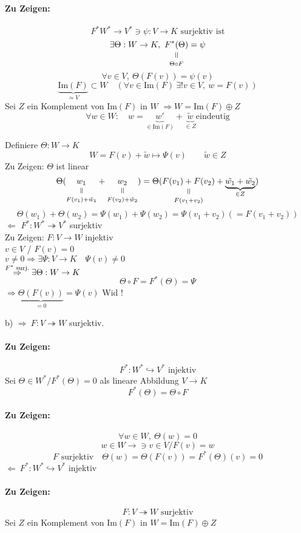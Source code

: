 \documentclass[titlepage,12pt,a4paper,ngerman]{report}
\newcommand{\verteq}{\rotatebox{90}{$\,=$}}
\newcommand{\equalto}[2]{\underset{\scriptstyle\overset{\mkern4mu\verteq}{#2}}{#1}}
\newcommand{\tx}[1]{\textrm{#1}}
\newcommand{\ub}[1]{\underbrace{#1}}
\begin{document}
\paragraph{Zu Zeigen:} $$F^* W^* \to V^* \ni \psi: V \to K \tx{ surjektiv ist}$$
$$\exists \Theta: W \to K,\ \equalto{F^* (\Theta)}{\Theta \circ F} = \psi$$
$$\forall v \in V,\ \Theta(F(v)) = \psi(v)$$
$$\underbrace{\tx{Im}(F)}_{\simeq V} \subset W \quad (\forall v \in \tx{Im}(F)\ \exists ! v \in V,\ w = F(v))$$
Sei $Z$ ein Komplement von Im$(F)$ in $W$ $\Rightarrow W=$Im$(F) \oplus Z$
$$\forall w \in W: \quad w= \underbrace{w'}_{\in \tx{Im}(F)} + \underbrace{\tilde w}_{\in Z} \tx{eindeutig}$$

Definiere $ \Theta: W \to K $\\
$$ W = F(v) + \tilde{w} \mapsto \Psi(v) \qquad \tilde{w} \in Z$$
Zu Zeigen: $\Theta$ ist linear
$$\Theta(\equalto{w_1}{F(v_1) + \tilde{w}_1} + \equalto{w_2}{F(v_2) + \tilde{w}_2})= \Theta (\equalto{F(v_1) + F(v_2)}{F(v_1+v_2)} + \ub{\tilde{w_1} + \tilde{w_2}}_{\in Z})$$
$$ \Theta(w_1) + \Theta(w_2) = \Psi(w_1) + \Psi(w_2) = \Psi(v_1+v_2) (= F(v_1 + v_2))$$
$\boxed{\Leftarrow}$ $ F^* : W^* \twoheadrightarrow V^* $ surjektiv\\
Zu Zeigen: $ F: V \to W $ injektiv\\
$ v \in V $ / $ F(v) = 0 $\\
$  v \neq 0 \Rightarrow  \exists \Psi:V \to K \quad \Psi(v) \neq 0 $\\
$ \buildrel F^* \tx{ surj.} \over \Rightarrow \exists \Theta : W \to K $
$$ \Theta \circ F = F^*(\Theta) = \Psi $$
$ \Rightarrow \ub{\Theta(F(v))}_{=0} = \Psi(v) $ Wid !

b) $\boxed{\Rightarrow}\ F: V \twoheadrightarrow W$ surjektiv.
\paragraph{Zu Zeigen:} $$F^* : W^* \hookrightarrow V^* \tx{ injektiv}$$
Sei $\Theta \in W^* / F^* (\Theta) = 0$ als lineare Abbildung $V \to K$
$$F^* (\Theta) = \Theta \circ F$$
\paragraph{Zu Zeigen:} $$\forall w \in W,\ \Theta(w) = 0$$
$$w \in W \to \ni v \in V / F(v) = w$$
$$F \tx{ surjektiv} \quad \Theta(w) = \Theta(F(v)) = F^*(\Theta)(v) = 0 $$
$\boxed{\Leftarrow}\ F^* : W^* \hookrightarrow V^*$ injektiv
\paragraph{Zu Zeigen:} $$ F: V \twoheadrightarrow W \tx{ surjektiv}$$
Sei $Z$ ein Komplement von Im$(F)$ in $W=$Im$(F) \oplus Z$
\end{document}
